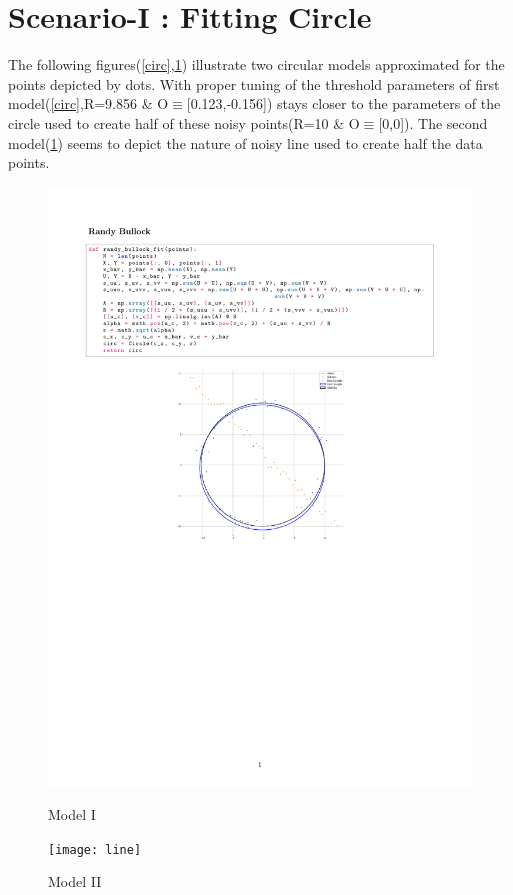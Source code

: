 \section*{Scenario-I : Fitting Circle}
\vspace*{-.2cm}
The following figures(\ref{circ},\ref{line}) illustrate two circular models approximated for the points depicted by dots. With proper tuning of the threshold parameters of first model(\ref{circ},R=9.856 \& O$\equiv$[0.123,-0.156]) stays closer to the parameters of the circle used to create half of these noisy points(R=10 \& O$\equiv$[0,0]). The second model(\ref{line}) seems to depict the nature of noisy line used to create half the data points.
\begin{figure}[h]
    \begin{minipage}{.48\textwidth}
        \begin{center}
            \includegraphics[width=.75\columnwidth]{circle}
            \caption{Model I}
            \label{circ}
        \end{center}
    \end{minipage}
    \begin{minipage}{.48\textwidth}
        \begin{center}
            \texttt{[image: line]}
            \caption{Model II}
            \label{line}
        \end{center}
    \end{minipage}
\end{figure}
\newpage
